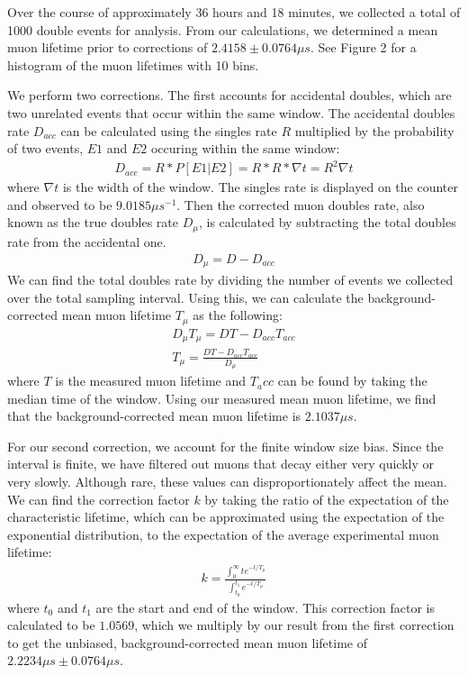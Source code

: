 \documentclass[
 reprint,
 twocolumn,
 amsmath,amssymb,
 aps,
 pra,
 floatfix,
]{revtex4-1}
\begin{document}
Over the course of approximately 36 hours and 18 minutes, we collected a total
of 1000 double events for analysis. From our calculations, we determined a mean
muon lifetime prior to corrections of $ 2.4158 \pm 0.0764 \mu s$. See Figure 2
for a histogram of the muon lifetimes with 10 bins.

We perform two corrections. The first accounts for accidental doubles, which
are two unrelated events that occur within the same window. The accidental
doubles rate $D_{acc}$ can be calculated using the singles rate $R$ multiplied
by the probability of two events, $E1$ and $E2$ occuring within the same window:
\begin{align}
    D_{acc} = R * P[E1 | E2] = R * R *\nabla t = R^2 \nabla t
\end{align}
where $\nabla t$ is the width of the window. The singles rate is displayed on
the counter and observed to be $9.0185 \mu s^{-1}$. Then the corrected muon
doubles rate, also known as the true doubles rate $D_\mu$, is calculated by subtracting
the total doubles rate from the accidental one.
\begin{align}
    D_\mu = D - D_{acc}
\end{align}
We can find the total doubles rate by dividing the number of events we collected
over the total sampling interval.
Using this, we can calculate the background-corrected mean muon lifetime $T_\mu$ as the
following:
\begin{align}
    D_\mu T_\mu = DT - D_{acc}T_{acc}\\
    T_\mu = \frac{DT - D_{acc}T_{acc}}{D_\mu}
\end{align}
where $T$ is the measured muon lifetime and $T_acc$ can be found by taking the
median time of the window. Using our measured mean muon lifetime, we find that
the background-corrected mean muon lifetime is $2.1037 \mu s$.

For our second correction, we account for the finite window size bias. Since
the interval is finite, we have filtered out muons that decay either very
quickly or very slowly. Although rare, these values can disproportionately
affect the mean. We can find the correction factor $k$ by taking the ratio of
the expectation of the characteristic lifetime, which can be approximated using
the expectation of the exponential distribution, to the expectation of the
average experimental muon lifetime:
\begin{align}
    k = \frac{\int_0^\infty t e^{-t / T_\mu}}{\int_{t_0}^{t_1} e^{-t / T_\mu}}
\end{align}
where $t_0$ and $t_1$ are the start and end of the window. This correction
factor is calculated to be $1.0569$, which we multiply by our result from the
first correction to get the unbiased, background-corrected mean muon lifetime
of $2.2234 \mu s \pm 0.0764 \mu s$.
\end{document}
